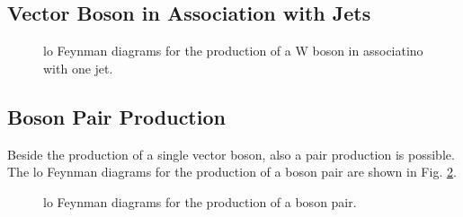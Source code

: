\subsection{Vector Boson in Association with Jets}


\begin{figure}[h]
\centering 
{}
\caption{\gls{lo} Feynman diagrams for the production of a W boson in associatino with one jet.}\label{fig:W_prod}
\end{figure}

\subsection{Boson Pair Production}

Beside the production of a single vector boson, also a pair production is possible.
The \gls{lo} Feynman diagrams for the production of a boson pair are shown in Fig. \ref{fig:dib_prod}.

\begin{figure}[h]
\centering 
{}
\caption{\gls{lo} Feynman diagrams for the production of a boson pair.}\label{fig:dib_prod}
\end{figure}


